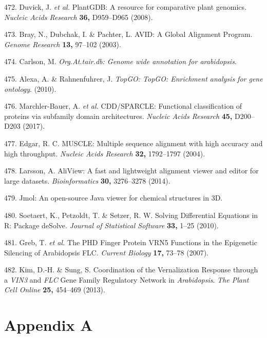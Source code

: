 \documentclass[12pt,]{book}
\begin{document}
\hypertarget{ref-duvick_plantgdb_2008}{}
472. Duvick, J. \emph{et al.} PlantGDB: A resource for comparative plant
genomics. \emph{Nucleic Acids Research} \textbf{36,} D959--D965 (2008).

\hypertarget{ref-bray_avid_2003}{}
473. Bray, N., Dubchak, I. \& Pachter, L. AVID: A Global Alignment
Program. \emph{Genome Research} \textbf{13,} 97--102 (2003).

\hypertarget{ref-r_go_arabidopsis}{}
474. Carlson, M. \emph{Org.At.tair.db: Genome wide annotation for
arabidopsis}.

\hypertarget{ref-r_top_go}{}
475. Alexa, A. \& Rahnenfuhrer, J. \emph{TopGO: TopGO: Enrichment
analysis for gene ontology}. (2010).

\hypertarget{ref-marchler_bauer_cdd_sparcle_2017}{}
476. Marchler-Bauer, A. \emph{et al.} CDD/SPARCLE: Functional
classification of proteins via subfamily domain architectures.
\emph{Nucleic Acids Research} \textbf{45,} D200--D203 (2017).

\hypertarget{ref-edgar_muscle_2004}{}
477. Edgar, R. C. MUSCLE: Multiple sequence alignment with high accuracy
and high throughput. \emph{Nucleic Acids Research} \textbf{32,}
1792--1797 (2004).

\hypertarget{ref-larsson_aliview_2014}{}
478. Larsson, A. AliView: A fast and lightweight alignment viewer and
editor for large datasets. \emph{Bioinformatics} \textbf{30,} 3276--3278
(2014).

\hypertarget{ref-jmol}{}
479. Jmol: An open-source Java viewer for chemical structures in 3D.

\hypertarget{ref-soetaert_solving_2010}{}
480. Soetaert, K., Petzoldt, T. \& Setzer, R. W. Solving Differential
Equations in R: Package deSolve. \emph{Journal of Statistical Software}
\textbf{33,} 1--25 (2010).

\hypertarget{ref-greb_phd_2007}{}
481. Greb, T. \emph{et al.} The PHD Finger Protein VRN5 Functions in the
Epigenetic Silencing of Arabidopsis FLC. \emph{Current Biology}
\textbf{17,} 73--78 (2007).

\hypertarget{ref-kim_coordination_2013}{}
482. Kim, D.-H. \& Sung, S. Coordination of the Vernalization Response
through a \emph{VIN3} and \emph{FLC} Gene Family Regulatory Network in
\emph{Arabidopsis}. \emph{The Plant Cell Online} \textbf{25,} 454--469
(2013).

\chapter*{Appendix A}\label{chapter:appendixa}
\end{document}
